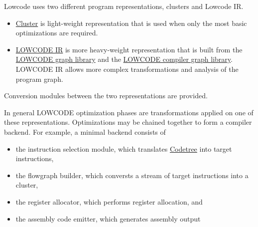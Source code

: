   Lowcode uses two different program representations, clusters and Lowcode IR.
\begin{itemize}
  \item \href{cluster.html}{Cluster} is light-weight representation
that is used when only the most basic optimizations are required.
  \item \href{lowcode-ir.html}{LOWCODE IR} is more heavy-weight
   representation that is built from the 
    \href{graphs.html}{LOWCODE graph library} and the
    \href{compiler-graphs.html}{LOWCODE compiler graph library}.
   LOWCODE IR allows more complex transformations and analysis of the
   program graph.
\end{itemize}
Conversion modules between the two representations are provided.

In general LOWCODE optimization phases are transformations applied on one
of these representations.  Optimizations may be chained together to form
a compiler backend.  For example, a minimal backend consists of
\begin{itemize}
  \item the instruction selection module, which translates 
\href{codetree.html}{Codetree} into target instructions,
  \item the flowgraph builder, which conversts a stream of target instructions
   into a cluster,
  \item the register allocator, which performs register allocation, and
  \item the assembly code emitter, which generates assembly output
\end{itemize}
